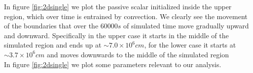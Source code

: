 In figure \ref{fig:2dsingle} we plot the passive scalar initialized inside the upper region, which over time is entrained by convection. We clearly see the movement of the boundaries that over the $60000 s$ of simulated time move gradually upward and downward. Specifically in the upper case it starts in the middle of the simulated region and ends up at $\sim 7.0 \times 10^{6} cm$, for the lower case it starts at $\sim 3.7 \times 10^{6} cm$ and moves downwards to the middle of the simulated region \\
In figure \ref{fig:2dsingle} we plot some parameters relevant to our analysis. \\
\begin{figure}[t!]
  \centering
      \hfill
	\hfill
  \centering
      \hfill

\end{figure}
